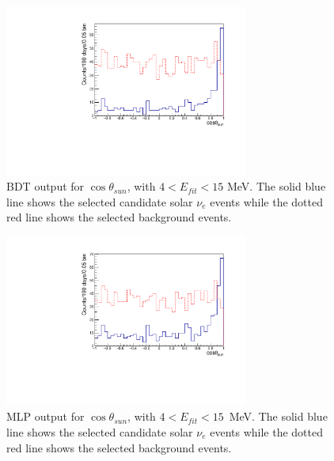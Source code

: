 %

\begin{figure}[!htb]
	\centering
	\includegraphics[width=8cm]{cosThetaToSun_4to15_BDT.pdf}
	\caption[BDT output for $\cos\theta_{sun}$, with $4<E_{fit}<15$ MeV.]{BDT output for $\cos\theta_{sun}$, with $4<E_{fit}<15$ MeV. The solid blue line shows the selected candidate solar $\nu_e$ events while the dotted red line shows the selected background events.}
	\label{cosThetaToSun_4to15_BDT}
\end{figure}

\begin{figure}[!htb]
	\centering
	\includegraphics[width=8cm]{cosThetaToSun_4to15_MLP.pdf}
	\caption[MLP output for $\cos\theta_{sun}$, with $4<E_{fit}<15$~MeV.]{MLP output for $\cos\theta_{sun}$, with $4<E_{fit}<15$~MeV. The solid blue line shows the selected candidate solar $\nu_e$ events while the dotted red line shows the selected background events.}
	\label{cosThetaToSun_4to15_MLP}
\end{figure}

